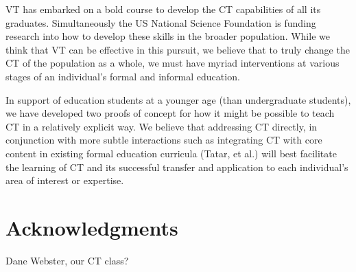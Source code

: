 \documentclass{acm_proc_article-sp}
\begin{document}
VT has embarked on a bold course to develop the CT capabilities of all its graduates. Simultaneously the US National Science Foundation is funding research into how to develop these skills in the broader population. While we think that VT can be effective in this pursuit, we believe that to truly change the CT of the population as a whole, we must have myriad interventions at various stages of an individual’s formal and informal education.

In support of education students at a younger age (than undergraduate students), we have developed two proofs of concept for how it might be possible to teach CT in a relatively explicit way. We believe that addressing CT directly, in conjunction with more subtle interactions such as integrating CT with core content in existing formal education curricula (Tatar, et al.) will best facilitate the learning of CT and its successful transfer and application to each individual’s area of interest or expertise.



\section{Acknowledgments}
Dane Webster, our CT class?
\end{document}
